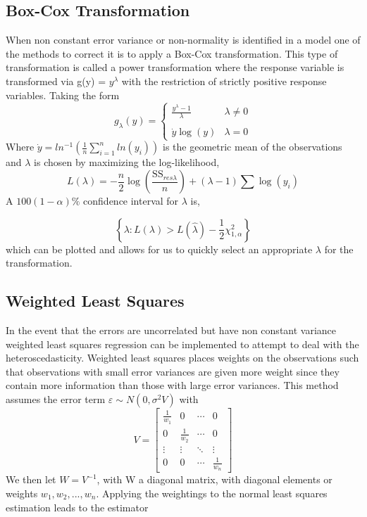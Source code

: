 \documentclass[12pt]{report}
\begin{document}
\subsection{Box-Cox Transformation}
When non constant error variance or non-normality is identified in a model one of the methods to correct it is to apply a Box-Cox transformation. This type of transformation is called a power transformation where the response variable is transformed via g(y) = $y^{\lambda}$ with the restriction of strictly positive response variables. Taking the form
\begin{equation}
    g_\lambda(y) = \left\{
        \begin{array}{lr}\displaystyle\frac{y^\lambda - 1}{\lambda} &  \lambda \neq 0\\
        & \\
       \dot{y}\log(y) &  \lambda = 0
     \end{array}
   \right.
\end{equation}
Where $\dot{y} = ln^{-1}(\frac{1}{n}\sum_{i=1}^n ln(y_{i}))$ is the geometric mean of the observations and $\lambda$ is chosen by maximizing the log-likelihood,
\begin{equation}
    L(\lambda) = -\frac{n}{2}\log(\frac{\text{SS}_{res \lambda}}{n}) + (\lambda -1)\sum \log(y_i)
\end{equation}
A $100(1 - \alpha)\%$ confidence interval for $\lambda$ is,

\begin{equation}
    \left\{ \lambda :  L(\lambda) > L(\hat{\lambda}) - \frac{1}{2}\chi_{1,\alpha}^2  \right\}
\end{equation}
which can be plotted and allows for us to quickly select an appropriate $\lambda$ for the transformation.

\subsection{Weighted Least Squares}
In the event that the errors are uncorrelated but have non constant variance weighted least squares regression can be implemented to attempt to deal with the heteroscedasticity. Weighted least squares places weights on the observations such that observations with small error variances are given more weight since they contain more information than those with large error variances. This method assumes the error term $\varepsilon \sim N(0,\sigma^{2}V)$ with 
\begin{equation}
V = 
    \begin{bmatrix}
    \frac{1}{w_1}      & 0     & \cdots & 0\\
    0 & \frac{1}{w_2}          & \cdots & 0\\
    \vdots & \vdots     & \ddots      & \vdots\\
    0 & 0     & \cdots & \frac{1}{w_n}
\end{bmatrix}
\end{equation}
We then let $W = V^{-1}$, with W a diagonal matrix, with diagonal elements or weights $w_{1}, w_{2}, . . . , w_{n}$. Applying the weightings to the normal least squares estimation leads to the estimator
\end{document}
